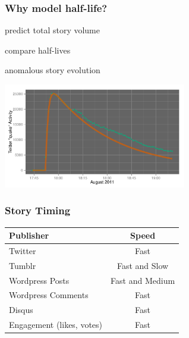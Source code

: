 \documentclass{beamer}
\begin{document}


\begin{frame}\frametitle{Why model half-life?}
\begin{center}
\begin{itemize}
\Huge{
\item predict total story volume
\item compare half-lives
\item anomalous story evolution
}
\end{itemize}
\end{center}
\end{frame}


\begin{frame}
  \begin{center}
    \includegraphics[width=8cm]{./imgs/va_quake_fit1.pdf}
  \end{center}
\end{frame}



\begin{frame} \frametitle{Story Timing}
\begin{table}
\begin{tabular}{l|c}
\hline
   {Publisher}   &   {Speed} \\
\hline 
    Twitter      &    Fast  \\ 
    Tumblr      &        Fast and Slow \\
    Wordpress Posts &   Fast and Medium   \\
    Wordpress Comments & Fast\\
    Disqus       &    Fast\\
    Engagement (likes, votes) &  Fast\\
\hline
\end{tabular}
\end{table}
\end{frame}
\end{document}
